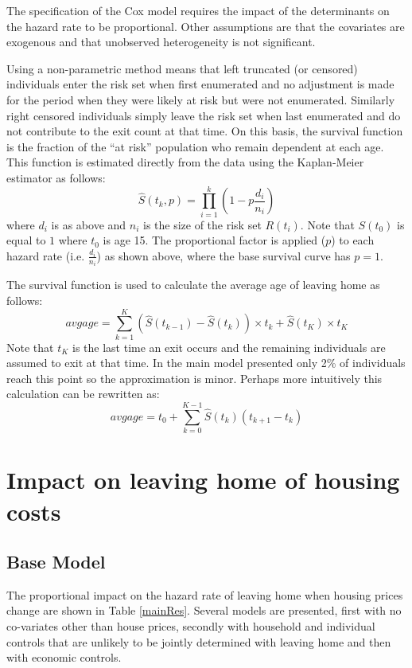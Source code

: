 \documentclass[12pt]{article}
\begin{document}
The specification of the Cox model requires the impact of the determinants on the hazard rate to be proportional. Other assumptions are that the covariates are exogenous and that unobserved heterogeneity is not significant.

Using a non-parametric method means that left truncated (or censored) individuals enter the risk set when first enumerated and no adjustment is made for the period when they were likely at risk but were not enumerated. Similarly right censored individuals simply leave the risk set when last enumerated and do not contribute to the exit count at that time. On this basis, the survival function is the fraction of the ``at risk'' population who remain dependent at each age. This function is estimated directly from the data using the Kaplan-Meier estimator as follows:
\[ \hat{S}(t_k, p)= \prod_{i=1}^k \left(1-{p \frac {d_i}{n_i}}\right) \]
where $d_i$ is as above and $n_i$ is the size of the risk set $R(t_i)$. Note that $S(t_0)$ is equal to $1$ where $t_0$ is age 15. The proportional factor is applied ($p$) to each hazard rate (i.e. $\frac {d_i}{n_i}$) as shown above, where the base survival curve has $p=1$.

The survival function is used to calculate the average age of leaving home as follows:
\begin{equation*}
  avgage = \sum_{k = 1}^K (\hat{S}(t_{k-1})-\hat{S}(t_{k})) \times t_k + \hat{S}(t_K) \times t_K
\end{equation*}
Note that $t_K$ is the last time an exit occurs and the remaining individuals are assumed to exit at that time. In the main model presented only 2\% of individuals reach this point so the approximation is minor. Perhaps more intuitively this calculation can be rewritten as:
\begin{equation*}
  avgage = t_0 + \sum_{k = 0}^{K-1} \hat{S}(t_{k})(t_{k+1} - t_{k})
\end{equation*}

\section{Impact on leaving home of housing costs}
\subsection{Base Model}
The proportional impact on the hazard rate of leaving home when housing prices change are shown in Table \ref{mainRes}. Several models are presented, first with no co-variates other than house prices, secondly with household and individual controls that are unlikely to be jointly determined with leaving home and then with economic controls.
\end{document}
